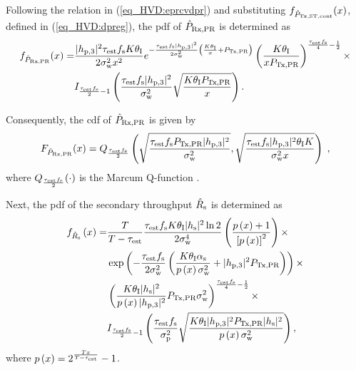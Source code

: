 Following the relation in (\ref{eq_HVD:eprcvdpr}) and substituting $f_{\hat{P}_{\text{Tx,ST,cont}}}(x)$, defined in (\ref{eq_HVD:dpreg}), the pdf of $\hat{P}_{\text{Rx,PR}}$ is determined as 
\begin{align}
f_{\hat{P}_{\text{Rx,PR}}}(x) =& \frac{|h_{\text{p,3}}|^2 \tau_{\text{est}} f_{\text{s}} K \theta_{\text{I}}}{2\sigma^2_{\text{w}} x^2} e^{- \frac{\tau_{\text{est}} f_{\text{s}} |h_{\text{p,3}}|^2}{2 \sigma^2_{\text{w}}}\left( \frac{K  \theta_{\text{I}}}{x} + P_{\text{Tx,PR}} \right)} \left( \frac{K \theta_{\text{I}}}{x P_{\text{Tx,PR}}}   \right)^{\frac{\tau_{\text{est}} f_{\text{s}}}{4} - \frac{1}{2}} \times \label{eq_HVD:dpp} \\
\quad & I_{\frac{\tau_{\text{est}} f_{\text{s}}}{2}  - 1}\left( \frac{\tau_{\text{est}} f_{\text{s}} |h_{\text{p,3}}|^2}{\sigma^2_{\text{w}}} \sqrt{\frac{ K \theta_{\text{I}} P_{\text{Tx,PR}}}{x}}  \right). \nonumber
\end{align}

Consequently, the cdf of $\hat{P}_{\text{Rx,PR}}$ is given by %
\begin{equation}
	\label{eq_HVD:cdf}
	\fprcvdpr(x) = Q_{\frac{\test \fsam}{2}}\left(\sqrt{\frac{\test \fsam \ptran \phpth}{\npp}},\sqrt{\frac{\test \fsam \phpth \ite K}{\npp x}}\right) \;  ,
\end{equation}
where $Q_{\frac{\tau_{\text{est}} f_{\text{s}}}{2}}(\cdot)$ is the Marcum Q-function \cite{Jef00}.

Next, the pdf of the secondary throughput $\hat{{{R}}}_{\text{s}}$ is determined as
\begin{align}
	f_{\hat{{{R}}}_{\text{s}}} \left(x\right)  =&  \frac{T}{T-\tau_{\text{est}}}\frac{\tau_{\text{est}} f_{\text{s}} K \theta_{\text{I}} |h_{\text{s}}|^2 \ln{2}}{2 \sigma^4_{\text{w}}} 
	\left(\frac{p\left(x\right)+1}{\left[p\left(x\right)\right]^2} \right) \times \label{eq_HVD:drs} \\ 
	& \exp \left(-\frac{\tau_{\text{est}} f_{\text{s}}}{2 \sigma^2_{\text{w}}} \left(\frac{K \theta_\textrm{I} \alpha_\textrm{s}}{p\left(x\right)\sigma^2_{\text{w}}} + |h_{\text{p,3}}|^2 P_{\text{Tx,PR}} \right) \right) \times \nonumber \\ 
	& \left(\frac{K \theta_{\text{I}} |h_{\text{s}}|^2}{p\left(x\right) |h_{\text{p,3}}|^2} P_{\text{Tx,PR}} \sigma^2_{\text{w}}\right)^{\frac{\tau_{\text{est}} f_{\text{s}}}{4}-\frac{1}{2}} \times \nonumber \\
	& I_{\frac{\tau_{\text{est}} f_{\text{s}}}{2}-1}\left(\frac{\tau_{\text{est}} f_{\text{s}}}{\sigma_\textrm{p}^2}\sqrt{\frac{K \theta_{\text{I}} |h_{\text{p,3}}|^2 P_{\text{Tx,PR}} |h_{\text{s}}|^2}{p\left(x\right) \sigma^2_{\text{w}}}}\right), \nonumber \\
\end{align}
where $p\left(x\right) = 2^\frac{Tx}{T-\tau_{\text{est}}}-1$.


